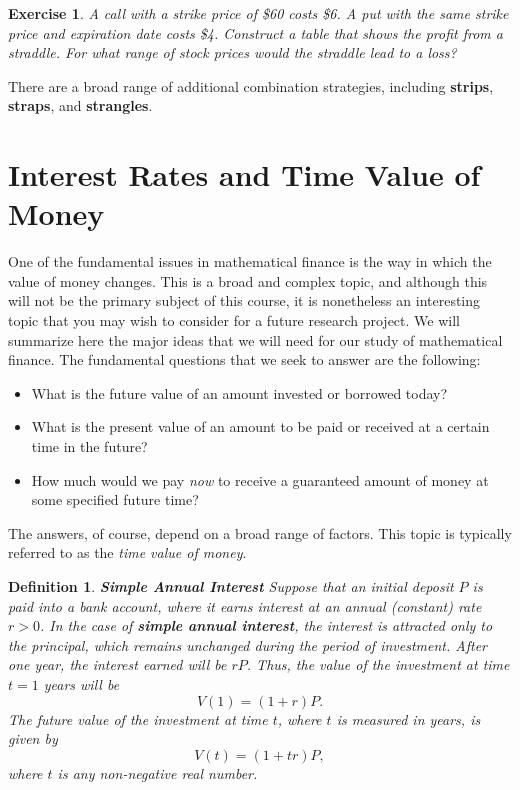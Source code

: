 \documentclass[letterpaper,10pt]{article}
\newtheorem{df}{Definition}[section]
\newtheorem{ex}{Exercise}
\begin{document}
\begin{ex}
A call with a strike price of \$60 costs \$6. A put with the same strike price and expiration date costs \$4. Construct a table that shows the profit from a straddle. For what range of stock prices would the straddle lead to a loss?
\end{ex}

\noindent There are a broad range of additional combination strategies, including {\bf strips}, {\bf straps}, and {\bf strangles}.



\newpage

\section{Interest Rates and Time Value of Money}

One of the fundamental issues in mathematical finance is the way in which the value of money changes.  This is a broad and complex topic, and although this will not be the primary subject of this course, it is nonetheless an interesting topic that you may wish to consider for a future research project.  We will summarize here the major ideas that we will need for our study of mathematical finance.  The fundamental questions that we seek to answer are the following:

\begin{itemize}

\item What is the future value of an amount invested or borrowed today?

\item What is the present value of an amount to be paid or received at a certain time in the future?

\item How much would we pay {\em now} to receive a guaranteed amount of money at some specified future time?

\end{itemize}

The answers, of course, depend on a broad range of factors.  This topic is typically referred to as the {\em time value of money}.

\begin{df}{\bf Simple Annual Interest}
Suppose that an initial deposit $P$ is paid into a bank account, where it earns interest at an annual (constant) rate $r>0$.  In the case of {\bf simple annual interest}, the interest is attracted only to the principal, which remains unchanged during the period of investment.  After one year, the interest earned will be $rP$.  Thus, the value of the investment at time $t=1$ years will be $$V(1)=(1+r)P.$$  The {\em future value} of the investment at time $t$, where $t$ is measured in years, is given by $$V(t)=(1+tr)P,$$ where $t$ is any non-negative real number.
\end{df}
\end{document}
